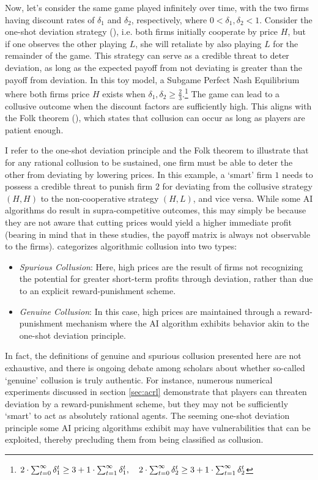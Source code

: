 \documentclass[mnsc,nonblindrev]{workingpaper}
\begin{document}
Now, let's consider the same game played infinitely over time, with the two firms having discount rates of $\delta_1$ and $\delta_2$, respectively, where $0 < \delta_1, \delta_2 < 1$. Consider the one-shot deviation strategy (\cite{hendon1996one}), i.e. both firms initially cooperate by price $H$, but if one observes the other playing $L$, she will retaliate by also playing $L$ for the remainder of the game. This strategy can serve as a credible threat to deter deviation, as long as the expected payoff from not deviating is greater than the payoff from deviation. In this toy model, a Subgame Perfect Nash Equilibrium where both firms price $H$ exists when $\delta_1,\delta_2 \ge \frac{2}{3}$.\footnote{$2\cdot \sum_{t=0}^\infty\delta_1^t \ge 3 + 1 \cdot \sum_{t=1}^\infty \delta_1^t, \quad 2\cdot \sum_{t=0}^\infty\delta_2^t \ge 3 + 1 \cdot \sum_{t=1}^\infty \delta_2^t \\$} The game can lead to a collusive outcome when the discount factors are sufficiently high. This aligns with the Folk theorem (\cite{friedman1971non}), which states that collusion can occur as long as players are patient enough.

I refer to the one-shot deviation principle and the Folk theorem to illustrate that for any rational collusion to be sustained, one firm must be able to deter the other from deviating by lowering prices. In this example, a `smart' firm $1$ needs to possess a credible threat to punish firm $2$ for deviating from the collusive strategy $(H, H)$ to the non-cooperative strategy $(H, L)$, and vice versa. While some AI algorithms do result in supra-competitive outcomes, this may simply be because they are not aware that cutting prices would yield a higher immediate profit (bearing in mind that in these studies, the payoff matrix is always not observable to the firms). \cite{calvano2023algorithmic} categorizes algorithmic collusion into two types:
\begin{itemize}
        \item \textit{Spurious Collusion}: Here, high prices are the result of firms not recognizing the potential for greater short-term profits through deviation, rather than due to an explicit reward-punishment scheme.
	\item \textit{Genuine Collusion}: In this case, high prices are maintained through a reward-punishment mechanism where the AI algorithm exhibits behavior akin to the one-shot deviation principle.
\end{itemize}
In fact, the definitions of genuine and spurious collusion presented here are not exhaustive, and there is ongoing debate among scholars about whether so-called `genuine' collusion is truly authentic. For instance, numerous numerical experiments discussed in section \ref{sec:acrl} demonstrate that players can threaten deviation by a reward-punishment scheme, but they may not be sufficiently ‘smart’ to act as absolutely rational agents. The seeming one-shot deviation principle some AI pricing algorithms exhibit may have vulnerabilities that can be exploited, thereby precluding them from being classified as collusion.
\end{document}
